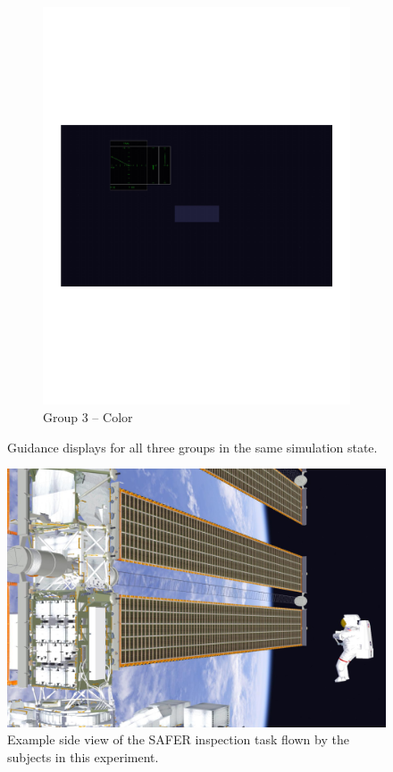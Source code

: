 \documentclass[]{aiaa-tc}%
\begin{document}
\begin{figure}[tb!]
\begin{subfigure}{.5\textwidth}
    \includegraphics[width=.99\linewidth, page=3]{figs/guidance_full.pdf}
    \caption{Group 3 -- Color}
    \label{fig:sub2}
  \end{subfigure}
  \caption{Guidance displays for all three groups in the same simulation state.}
  \label{fig:displays}
\end{figure}

\begin{figure}[tb!]
  \centering
  \includegraphics[width=0.8\linewidth]{figs/safer_visual.png}
  \caption{Example side view of the SAFER inspection task flown by the subjects in this experiment.}
  \label{fig:safer_demo}
\end{figure}
\end{document}
